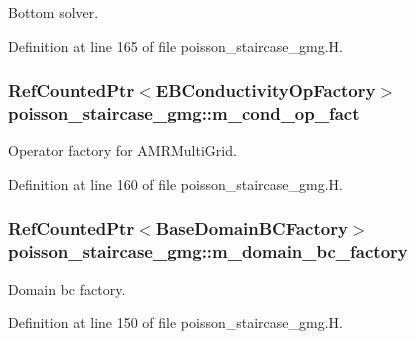 Bottom solver. 



Definition at line 165 of file poisson\+\_\+staircase\+\_\+gmg.\+H.

\subsubsection[{\texorpdfstring{m\+\_\+cond\+\_\+op\+\_\+fact}{m_cond_op_fact}}]{\setlength{\rightskip}{0pt plus 5cm}Ref\+Counted\+Ptr$<$E\+B\+Conductivity\+Op\+Factory$>$ poisson\+\_\+staircase\+\_\+gmg\+::m\+\_\+cond\+\_\+op\+\_\+fact\hspace{0.3cm}{\ttfamily [protected]}}\hypertarget{classpoisson__staircase__gmg_ab6d3d107ddcc3afea9e798b9cc1aecd8}{}\label{classpoisson__staircase__gmg_ab6d3d107ddcc3afea9e798b9cc1aecd8}


Operator factory for A\+M\+R\+Multi\+Grid. 



Definition at line 160 of file poisson\+\_\+staircase\+\_\+gmg.\+H.

\subsubsection[{\texorpdfstring{m\+\_\+domain\+\_\+bc\+\_\+factory}{m_domain_bc_factory}}]{\setlength{\rightskip}{0pt plus 5cm}Ref\+Counted\+Ptr$<$Base\+Domain\+B\+C\+Factory$>$ poisson\+\_\+staircase\+\_\+gmg\+::m\+\_\+domain\+\_\+bc\+\_\+factory\hspace{0.3cm}{\ttfamily [protected]}}\hypertarget{classpoisson__staircase__gmg_ad41c6e5a1c27a79ab4c843032951e21b}{}\label{classpoisson__staircase__gmg_ad41c6e5a1c27a79ab4c843032951e21b}


Domain bc factory. 



Definition at line 150 of file poisson\+\_\+staircase\+\_\+gmg.\+H.

